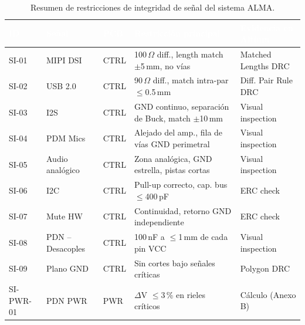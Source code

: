\begin{table}[H]
  \centering
  \caption{Resumen de restricciones de integridad de señal del sistema ALMA.}
  \label{tab:si_resumen}
  \begin{tabularx}{\textwidth}{C{1.2cm} L{2.5cm} C{1.5cm} L{5.5cm} L{3cm}}
    \toprule
    \textcolor{white}{\textbf{ID}} &
    \textcolor{white}{\textbf{Señal}} &
    \textcolor{white}{\textbf{PCB}} &
    \textcolor{white}{\textbf{Restricción principal}} &
    \textcolor{white}{\textbf{Evidencia en Altium}} \\
    \midrule
    SI-01 & MIPI DSI  & CTRL & 100\,$\Omega$ diff., length match $\pm$5\,mm, no vías & Matched Lengths DRC \\
    SI-02 & USB 2.0   & CTRL & 90\,$\Omega$ diff., match intra-par $\leq$0.5\,mm & Diff. Pair Rule DRC \\
    SI-03 & I2S       & CTRL & GND continuo, separación de Buck, match $\pm$10\,mm & Visual inspection \\
    SI-04 & PDM Mics  & CTRL & Alejado del amp., fila de vías GND perimetral & Visual inspection \\
    SI-05 & Audio analógico & CTRL & Zona analógica, GND estrella, pistas cortas & Visual inspection \\
    SI-06 & I2C       & CTRL & Pull-up correcto, cap. bus $\leq$400\,pF & ERC check \\
    SI-07 & Mute HW   & CTRL & Continuidad, retorno GND independiente & ERC check \\
    SI-08 & PDN -- Desacoples & CTRL & 100\,nF a $\leq$1\,mm de cada pin VCC & Visual inspection \\
    SI-09 & Plano GND & CTRL & Sin cortes bajo señales críticas & Polygon DRC \\
    SI-PWR-01 & PDN PWR  & PWR & $\Delta$V $\leq$3\,\% en rieles críticos & Cálculo (Anexo B) \\
    \bottomrule
  \end{tabularx}
\end{table}
